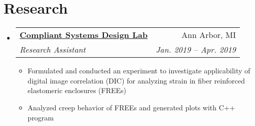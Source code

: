 \documentclass[letterpaper,11pt]{article}
\makeatletter
\newcommand{\resumeSubheading}[4]{
  \vspace{-1pt}\item
    \begin{tabular*}{0.97\textwidth}[t]{l@{\extracolsep{\fill}}r}
      \textbf{#1} & #2 \\
      \textit{\small#3} & \textit{\small #4} \\
    \end{tabular*}\vspace{-5pt}
}
\newcommand{\resumeSubHeadingListStart}{\begin{itemize}[leftmargin=*]}
\newcommand{\resumeSubHeadingListEnd}{\end{itemize}}
\newcommand{\resumeItemListStart}{\begin{itemize}}
\newcommand{\resumeItemListEnd}{\end{itemize}\vspace{-5pt}}
\makeatother
\begin{document}
\section{Research}
\resumeSubHeadingListStart

\resumeSubheading
{\href{http://csdl.engin.umich.edu/}{Compliant Systems Design Lab}}{Ann Arbor, MI}
{Research Assistant}{Jan. 2019 -- Apr. 2019}

\resumeItemListStart

\item {Formulated and conducted an experiment to investigate applicability of digital image correlation (DIC) for analyzing strain in fiber reinforced elastomeric enclosures (FREEs)}

\item {Analyzed creep behavior of FREEs and generated plots with C++ program}

\resumeItemListEnd

\resumeSubHeadingListEnd








\end{document}
